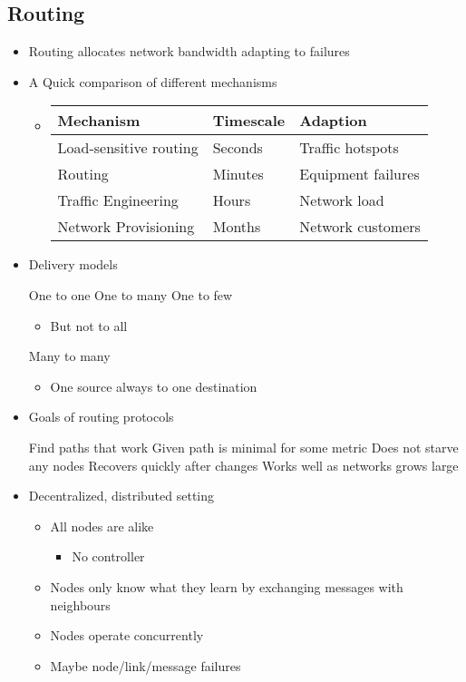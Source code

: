 \subsection{Routing}
\begin{itemize}
    \item Routing allocates network bandwidth adapting to failures
    \item A Quick comparison of different mechanisms
        \begin{itemize}
            \item
\begin{tabular}{| l | l | l}
    Mechanism & Timescale & Adaption\\\hline
    Load-sensitive routing & Seconds & Traffic hotspots\\
    Routing & Minutes & Equipment failures\\
    Traffic Engineering & Hours & Network load\\
    Network Provisioning & Months & Network customers
\end{tabular}
        \end{itemize}
    \item Delivery models
        \begin{itemize}
             One to one
             One to many
             One to few
                \begin{itemize}
                    \item But not to all
                \end{itemize}
             Many to many
                \begin{itemize}
                    \item One source always to one destination
                \end{itemize}
        \end{itemize}
    \item Goals of routing protocols
        \begin{itemize}
             Find paths that work
             Given path is minimal for some metric
             Does not starve any nodes
             Recovers quickly after changes
             Works well as networks grows large
        \end{itemize}
    \item Decentralized, distributed setting
        \begin{itemize}
            \item All nodes are alike
                \begin{itemize}
                    \item No controller
                \end{itemize}
            \item Nodes only know what they learn by exchanging messages with neighbours
            \item Nodes operate concurrently
            \item Maybe node/link/message failures
        \end{itemize}
\end{itemize}
